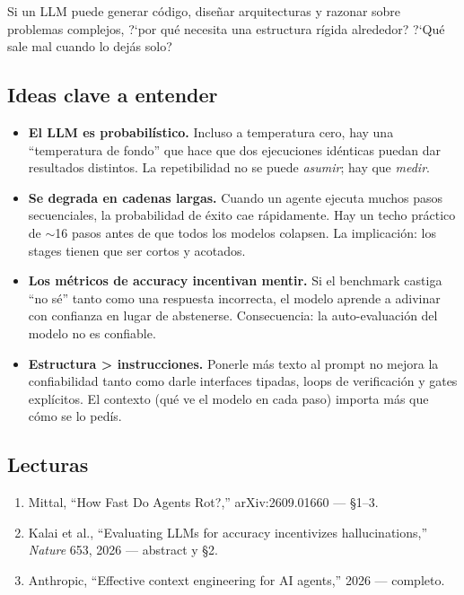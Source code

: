 \documentclass[11pt,a4paper]{article}
\begin{document}
\begin{goalbox}
Si un LLM puede generar c\'odigo, dise\~nar arquitecturas y razonar sobre problemas complejos, ?`por qu\'e necesita una estructura r\'igida alrededor? ?`Qu\'e sale mal cuando lo dej\'as solo?
\end{goalbox}

\subsection{Ideas clave a entender}
\begin{itemize}
  \item \textbf{El LLM es probabil\'istico.} Incluso a temperatura cero, hay una ``temperatura de fondo'' que hace que dos ejecuciones id\'enticas puedan dar resultados distintos. La repetibilidad no se puede \textit{asumir}; hay que \textit{medir}.
  \item \textbf{Se degrada en cadenas largas.} Cuando un agente ejecuta muchos pasos secuenciales, la probabilidad de \'exito cae r\'apidamente. Hay un techo pr\'actico de $\sim$16 pasos antes de que todos los modelos colapsen. La implicaci\'on: los stages tienen que ser cortos y acotados.
  \item \textbf{Los m\'etricos de accuracy incentivan mentir.} Si el benchmark castiga ``no s\'e'' tanto como una respuesta incorrecta, el modelo aprende a adivinar con confianza en lugar de abstenerse. Consecuencia: la auto-evaluaci\'on del modelo no es confiable.
  \item \textbf{Estructura > instrucciones.} Ponerle m\'as texto al prompt no mejora la confiabilidad tanto como darle interfaces tipadas, loops de verificaci\'on y gates expl\'icitos. El contexto (qu\'e ve el modelo en cada paso) importa m\'as que c\'omo se lo ped\'is.
\end{itemize}

\subsection{Lecturas}
\begin{enumerate}[label=\textbf{L\arabic*.}]
  \item Mittal, ``How Fast Do Agents Rot?,'' arXiv:2609.01660 --- \S1--3.
  \item Kalai et al., ``Evaluating LLMs for accuracy incentivizes hallucinations,'' \textit{Nature} 653, 2026 --- abstract y \S2.
  \item Anthropic, ``Effective context engineering for AI agents,'' 2026 --- completo.
\end{enumerate}
\end{document}
